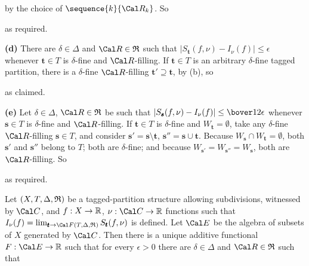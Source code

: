 {

\noindent by the choice of $\sequence{k}{\Cal R_k}$.   So


\noindent as required.

\medskip

{\bf (d)} There are $\delta\in\Delta$ and $\Cal R\in\frak R$ such that
$|S_{\pmb{t}}(f,\nu)-I_{\nu}(f)|\le\epsilon$ whenever $\pmb{t}\in T$
is
$\delta$-fine and $\Cal R$-filling.   If $\pmb{t}\in T$ is an
arbitrary
$\delta$-fine tagged partition, there is a $\delta$-fine
$\Cal R$-filling $\pmb{t}'\supseteq\pmb{t}$, by (b), so


\noindent as claimed.

\medskip

{\bf (e)} Let $\delta\in\Delta$, $\Cal R\in\frak R$ be such that
$|S_{\pmb{s}}(f,\nu)-I_{\nu}(f)|\le\bover12\epsilon$ whenever 
$\pmb{s}\in T$ is $\delta$-fine and $\Cal R$-filling.   If $\pmb{t}\in T$
is $\delta$-fine and $W_{\pmb{t}}=\emptyset$, take any
$\delta$-fine $\Cal R$-filling $\pmb{s}\in T$, and consider
$\pmb{s}'=\pmb{s}\setminus\pmb{t}$, $\pmb{s}''=\pmb{s}\cup\pmb{t}$.
Because $W_{\pmb{s}}\cap W_{\pmb{t}}=\emptyset$, both $\pmb{s}'$ and
$\pmb{s}''$ belong to $T$;  both are $\delta$-fine;  and because
$W_{\pmb{s}'}=W_{\pmb{s}''}=W_{\pmb{s}}$, both are $\Cal R$-filling.
So


\noindent as required.
}%

 Let $(X,T,\Delta,\frak R)$ be a
tagged-partition structure allowing subdivisions, witnessed by $\Cal
C$,
and $f:X\to\Bbb R$, $\nu:\Cal C\to\Bbb R$ functions such that
$I_{\nu}(f)=\lim_{\pmb{t}\to\Cal F(T,\Delta,\frak
R)}S_{\pmb{t}}(f,\nu)$
is defined.   Let $\Cal E$ be the algebra of subsets of $X$ generated
by
$\Cal C$.   Then there is a unique additive functional
$F:\Cal E\to\Bbb R$ such that for every $\epsilon>0$ there are
$\delta\in\Delta$ and $\Cal R\in\frak R$ such that

